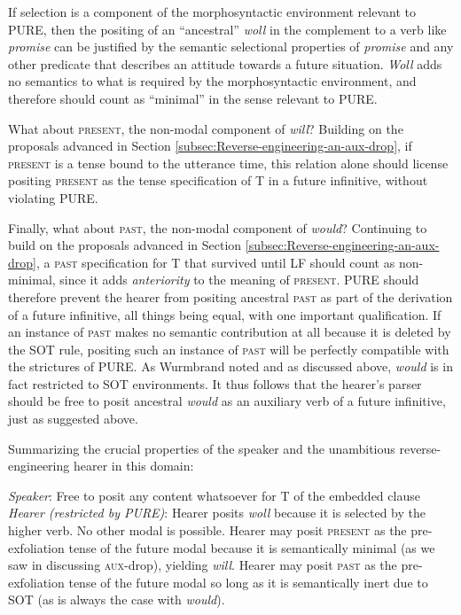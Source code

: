 \documentclass[output=paper]{langscibook}
\begin{document}
If selection is a component of the morphosyntactic environment relevant to PURE, then the positing of an “ancestral” \textit{woll} in the complement to a verb like \textit{promise} can be justified by the semantic selectional properties of \textit{promise} and any other predicate that describes an attitude towards a future situation. \textit{Woll} adds no semantics to what is required by the morphosyntactic environment, and therefore should count as “minimal” in the sense relevant to PURE. 
 
What about \textsc{present}, the non-modal component of \textit{will}? Building on the proposals advanced in Section \ref{subsec:Reverse-engineering-an-aux-drop}, if \textsc{present} is a tense bound to the utterance time, this relation alone should license positing \textsc{present} as the tense specification of T in a future infinitive, without violating PURE. 

Finally, what about \textsc{past}, the non-modal component of \textit{would}? Continuing to build on the proposals advanced in Section \ref{subsec:Reverse-engineering-an-aux-drop}, a \textsc{past} specification for T that survived until LF should count as non-minimal, since it adds\textit{ anteriority} to the meaning of \textsc{present}. PURE should therefore prevent the hearer from positing ancestral \textsc{past} as part of the derivation of a future infinitive, all things being equal, with one important qualification. If an instance of \textsc{past} makes no semantic contribution at all because it is deleted by the SOT rule, positing such an instance of \textsc{past} will be perfectly compatible with the strictures of PURE. As Wurmbrand noted and as discussed above, \textit{would} is in fact restricted to SOT environments. It thus follows that the hearer's parser should be free to posit ancestral \textit{would} as an auxiliary verb of a future infinitive, just as suggested above.

Summarizing the crucial properties of the speaker and the unambitious
re\-verse-engineering hearer in this domain:

\pex
{}
\textit{Speaker}: Free to posit any content whatsoever for T of the embedded clause\\
\textit{Hearer (restricted by \textnormal{PURE})}:
\a Hearer posits \textit{woll} because it is selected by the higher verb. No other modal is possible.
\a Hearer may posit \textsc{present} as the pre-exfoliation tense of the future modal because it is semantically minimal (as we saw in discussing \textsc{aux}-drop), yielding \textit{will}.
\a Hearer may posit \textsc{past} as the pre-exfoliation tense of the future modal so long as it is semantically inert due to SOT (as is always the case with \textit{would}).
\xe
\end{document}
